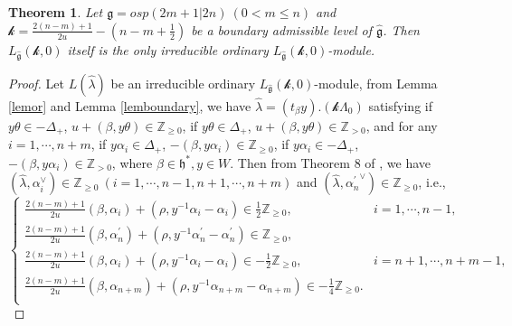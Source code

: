\documentclass[12pt]{article}
\newtheorem{thm}{Theorem}[section]
\begin{document}
\begin{thm}\label{thmbmn1}
Let $\mathfrak{g}=osp(2m+1|2n)~(0<m\leq n)$ and
$\mathcal{k}=\frac{2(n-m)+1}{2u}-(n-m+\frac{1}{2})$ be a boundary admissible level of $\widehat{\mathfrak{g}}$.
Then $L_{\widehat{\mathfrak{g}}}(\mathcal{k},0)$ itself is the only irreducible ordinary $L_{\widehat{\mathfrak{g}}}(\mathcal{k},0)$-module.
\end{thm}
\begin{proof}
Let $L(\hat{\lambda})$ be an irreducible ordinary $L_{\widehat{\mathfrak{g}}}(\mathcal{k},0)$-module,
from Lemma \ref{lemor} and  Lemma \ref{lemboundary}, we have $\hat{\lambda}=(t_\beta y).(\mathcal{k}\Lambda_0)$
satisfying if $y\theta\in -\Delta_+$, $u+(\beta,y\theta)\in\mathbb{Z}_{\geq0}$,
if $y\theta\in \Delta_+$, $u+(\beta,y\theta)\in\mathbb{Z}_{>0}$,
and for any $i=1,\cdots,n+m$,
if $y\alpha_i\in \Delta_+$, $-(\beta,y\alpha_i)\in\mathbb{Z}_{\geq0}$,
if $y\alpha_i\in -\Delta_+$, $-(\beta,y\alpha_i)\in\mathbb{Z}_{>0}$,
where $\beta\in \mathfrak{h}^*, y\in W$.
Then from Theorem 8 of \cite{Kac77}, we have
$(\hat{\lambda}, \alpha_i^\vee)\in \mathbb{Z}_{\geq0} ~(i=1,\cdots,n-1,n+1,\cdots,n+m)$ and $(\hat{\lambda}, {\alpha_n^\prime}^\vee)\in \mathbb{Z}_{\geq0}$,
i.e.,
$$\begin{cases}
  \frac{2(n-m)+1}{2u}(\beta,\alpha_i)+(\rho,y^{-1}\alpha_i-\alpha_i)\in \frac{1}{2}\mathbb{Z}_{\geq0},&i=1,\cdots,n-1,\\
 \frac{2(n-m)+1}{2u}(\beta,\alpha_n^\prime)+(\rho,y^{-1}\alpha_n^\prime-\alpha_n^\prime)\in \mathbb{Z}_{\geq0},\\
  \frac{2(n-m)+1}{2u}(\beta,\alpha_i)+(\rho,y^{-1}\alpha_i-\alpha_i)\in -\frac{1}{2}\mathbb{Z}_{\geq0},&i=n+1,\cdots,n+m-1,\\
 \frac{2(n-m)+1}{2u}(\beta,\alpha_{n+m})+(\rho,y^{-1}\alpha_{n+m}-\alpha_{n+m})\in -\frac{1}{4}\mathbb{Z}_{\geq0}.\\
\end{cases}$$


\end{proof}
\end{document}
